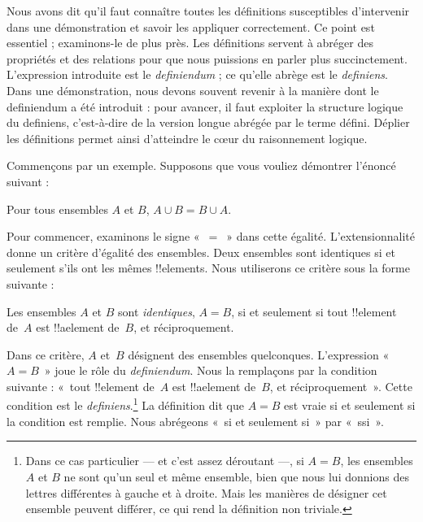 \documentclass[../../../include/open-logic-section]{subfiles}
\begin{document}


Nous avons dit qu'il faut connaître
toutes les définitions susceptibles
d'intervenir dans une démonstration
et savoir les appliquer correctement.
Ce point est essentiel ; examinons-le
de plus près. Les définitions servent
à abréger des propriétés et des
relations pour que nous puissions
en parler plus succinctement.
L'expression introduite est le
\emph{definiendum} ; ce qu'elle
abrège est le \emph{definiens}.
Dans une démonstration, nous devons
souvent revenir à la manière dont
le definiendum a été introduit :
pour avancer, il faut exploiter
la structure logique du definiens,
c'est-à-dire de la version longue
abrégée par le terme défini.
Déplier les définitions permet
ainsi d'atteindre le cœur du
raisonnement logique.

Commençons par un exemple.
Supposons que vous vouliez
démontrer l'énoncé suivant :

\begin{prop}
Pour tous ensembles $A$ et $B$,
$A \cup B = B \cup A$.
\end{prop}

Pour commencer, examinons le signe «~$=$~» dans cette égalité.
L'extensionnalité donne un critère d'égalité des ensembles.
Deux ensembles sont identiques si et seulement s'ils ont les
mêmes !!{element}s. Nous utiliserons ce critère sous la forme
suivante :

\begin{defn}
Les ensembles $A$ et $B$ sont
\emph{identiques}, $A = B$,
si et seulement si tout !!{element}
de~$A$ est !!a{element} de~$B$,
et réciproquement.
\end{defn}

Dans ce critère, $A$ et~$B$ désignent des ensembles quelconques.
L'expression «~$A = B$~» joue le rôle du \emph{definiendum}.
Nous la remplaçons par la condition suivante :
«~tout !!{element} de~$A$
est !!a{element} de~$B$,
et réciproquement~».
Cette condition est le
\emph{definiens}.\footnote{
Dans ce cas particulier — et
c'est assez déroutant —, si
$A = B$, les ensembles $A$
et $B$ ne sont qu'un seul
et même ensemble, bien que
nous lui donnions des lettres
différentes à gauche et à
droite. Mais les manières de
désigner cet ensemble peuvent
différer, ce qui rend la
définition non triviale.}
La définition dit que
$A = B$ est vraie si et
seulement si la condition
est remplie. Nous abrégeons
«~si et seulement si~»
par «~ssi~».
\end{document}
